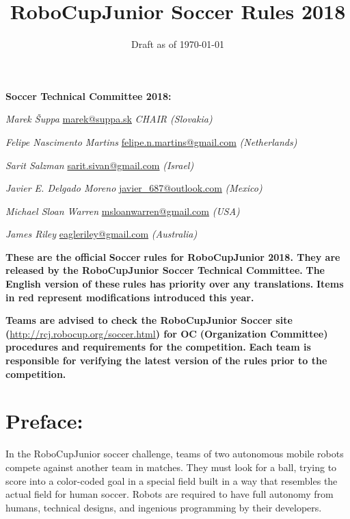 \documentclass{article}
\title{RoboCupJunior Soccer Rules 2018}
\date{Draft as of \today}
\begin{document}
\maketitle

\textbf{Soccer Technical Committee 2018:}

\textit{Marek \v{S}uppa} \underline{marek@suppa.sk} \textit{CHAIR (Slovakia)}

\textit{\textcolor{color-4}{Felipe Nascimento Martins}} \underline{felipe.n.martins@gmail.com} \textit{\textcolor{color-4}{(Netherlands)}}

\textit{\textcolor{color-4}{Sarit Salzman}} \underline{sarit.sivan@gmail.com} \textit{\textcolor{color-4}{(Israel)}}

\textit{\textcolor{color-4}{Javier E. Delgado Moreno}} \underline{javier\_687@outlook.com} \textit{\textcolor{color-4}{(Mexico)}}

\textit{\textcolor{color-4}{Michael Sloan Warren}} \underline{msloanwarren@gmail.com} \textit{\textcolor{color-4}{(USA)}}

\textit{\textcolor{color-4}{James Riley}} \underline{eagleriley@gmail.com} \textit{\textcolor{color-4}{(Australia)}}

\textbf{These are the official} \textbf{\textcolor{color-5}{Soccer}} \textbf{rules for RoboCupJunior 2018. They are released by the RoboCupJunior Soccer Technical Committee.} \textbf{\textcolor{color-5}{The English version of these}} \textbf{rules has priority over any translations.} \textbf{\textcolor{color-5}{Items in red represent modifications introduced this year.}}

\textbf{Teams are advised to check the RoboCupJunior Soccer site (}\underline{\href{http://rcj.robocup.org/soccer.html}{http://rcj.robocup.org/soccer.html}}\textbf{) for OC} \textbf{\textcolor{color-5}{(Organization Committee)}} \textbf{procedures and requirements for the competition.} \textbf{\textcolor{color-5}{Each team is responsible for verifying the latest version of the rules prior to the competition.}}

\section*{Preface:}

In the RoboCupJunior soccer challenge, teams of two autonomous mobile robots compete against another team in matches. They must look for a ball, trying to score into a color-coded goal in a special field built in a way that resembles the actual field for human soccer. Robots are required to have full autonomy from humans, technical designs, and ingenious programming by their developers.
\end{document}
